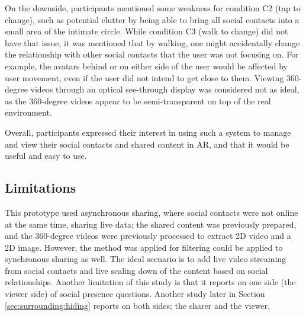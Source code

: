 On the downside, participants mentioned some weakness for condition C2 (tap to change), such as potential clutter by being able to bring all social contacts into a small area of the intimate circle. While condition C3 (walk to change) did not have that issue, it was mentioned that by walking, one might accidentally change the relationship with other social contacts that the user was not focusing on. For example, the avatars behind or on either side of the user would be affected by user movement, even if the user did not intend to get close to them. Viewing 360-degree videos through an optical see-through display was considered not as ideal, as the 360-degree videos appear to be semi-transparent on top of the real environment.

Overall, participants expressed their interest in using such a system to manage and view their social contacts and shared content in AR, and that it would be useful and easy to use. 

\subsection{Limitations}

This prototype used asynchronous sharing, where social contacts were not online at the same time, sharing live data; the shared content was previously prepared, and the 360-degree videos were previously processed to extract 2D video and a 2D image. However, the method was applied for filtering could be applied to synchronous sharing as well. The ideal scenario is to add live video streaming from social contacts and live scaling down of the content based on social relationships. Another limitation of this study is that it reports on one side (the viewer side) of social presence questions. Another study later in Section \ref{sec:surrounding:hiding} reports on both sides; the sharer and the viewer. 



